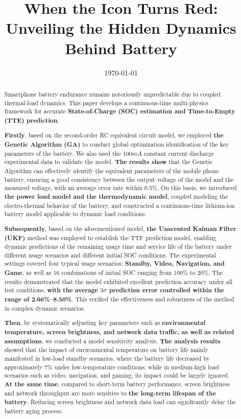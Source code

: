 \documentclass{mcmthesis}
\title{When the Icon Turns Red: Unveiling the Hidden Dynamics Behind Battery }
\date{\today}
\begin{document}
\begin{abstract}
Smartphone battery endurance remains notoriously unpredictable due to coupled thermal-load dynamics.
This paper develops a continuous-time multi-physics framework for accurate \textbf{State-of-Charge (SOC) estimation and Time-to-Empty (TTE) prediction}.

\textbf{Firstly}, based on the second-order RC equivalent circuit model, we employed \textbf{the Genetic Algorithm (GA)} to conduct global optimization identification of the key parameters of the battery.
We also used the $100mA$ constant current discharge experimental data to validate the model.
\textbf{The results show} that the Genetic Algorithm can effectively identify the equivalent parameters of the mobile phone battery,
ensuring a good consistency between the output voltage of the model and the measured voltage, with an average error rate within 0.5\%.
On this basis, we introduced \textbf{the power load model and the thermodynamic model},
coupled modeling the electro-thermal behavior of the battery,
and constructed a continuous-time lithium-ion battery model applicable to dynamic load conditions. 

\textbf{Subsequently}, based on the aforementioned model, \textbf{the Unscented Kalman Filter (UKF)} method was employed to establish the TTF prediction model, enabling dynamic predictions of the remaining usage time and service life of the battery under different usage scenarios and different initial SOC conditions. 
The experimental settings covered four typical usage scenarios: \textbf{Standby, Video, Navigation, and Game}, as well as 16 combinations of initial SOC  ranging from 100\% to 20\%.
The results demonstrated that the model exhibited excellent prediction accuracy under all test conditions,
\textbf{with the average $3\sigma$ prediction error controlled within the range of 2.66\%–8.50\%}.
This verified the effectiveness and robustness of the method in complex dynamic scenarios. 

\textbf{Then}, by systematically adjusting key parameters such as \textbf{environmental temperature, screen brightness, and network data traffic, as well as related assumptions},
we conducted a model sensitivity analysis.
\textbf{The analysis results} showed that the impact of environmental temperature on battery life mainly manifested in low-load standby scenarios,
where the battery life decreased by approximately 7\% under low-temperature conditions;
while in medium-high load scenarios such as video, navigation, and gaming, its impact could be largely ignored.
\textbf{At the same time}, compared to short-term battery performance, screen brightness and network throughput are more sensitive to \textbf{the long-term lifespan of the battery}. 
Reducing screen brightness and network data load can significantly delay the battery aging process. 


\end{abstract}
\end{document}
